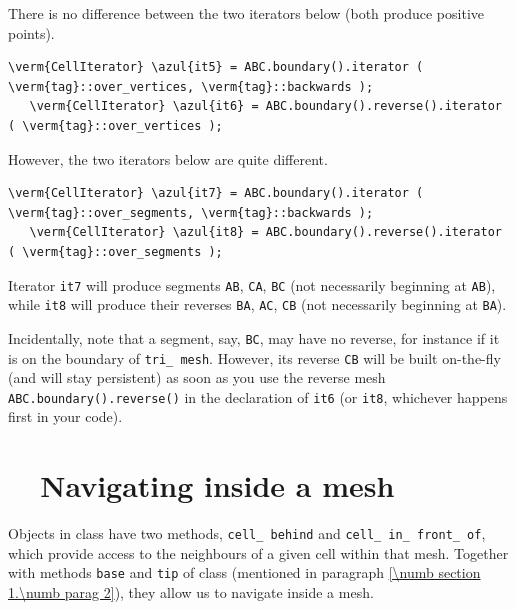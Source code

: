 There is no difference between the two iterators below (both produce positive
points).

\begin{Verbatim}[commandchars=\\\{\},formatcom=\small\tt,
   baselinestretch=0.94,framesep=2mm                      ]
   \verm{CellIterator} \azul{it5} = ABC.boundary().iterator ( \verm{tag}::over_vertices, \verm{tag}::backwards );
   \verm{CellIterator} \azul{it6} = ABC.boundary().reverse().iterator ( \verm{tag}::over_vertices );
\end{Verbatim}

However, the two iterators below are quite different.

\begin{Verbatim}[commandchars=\\\{\},formatcom=\small\tt,
   baselinestretch=0.94,framesep=2mm                      ]
   \verm{CellIterator} \azul{it7} = ABC.boundary().iterator ( \verm{tag}::over_segments, \verm{tag}::backwards );
   \verm{CellIterator} \azul{it8} = ABC.boundary().reverse().iterator ( \verm{tag}::over_segments );
\end{Verbatim}

Iterator {\small\tt it7} will produce segments {\small\tt AB}, {\small\tt CA}, {\small\tt BC}
(not necessarily beginning at {\small\tt AB}), while {\small\tt it8} will produce their reverses
{\small\tt BA}, {\small\tt AC}, {\small\tt CB} (not necessarily beginning at {\small\tt BA}).

Incidentally, note that a segment, say, {\small\tt BC}, may have no reverse,
for instance if it is on the boundary of {\small\tt tri\_\,mesh}.
However, its reverse {\small\tt CB} will be built on-the-fly (and will stay persistent)
as soon as you use the reverse mesh {\small\tt ABC.boundary().reverse()} in the declaration of
{\small\tt it6} (or {\small\tt it8}, whichever happens first in your code).


\section{~~Navigating inside a mesh}\label{\numb section 9.\numb parag 8}

Objects in class {\small\tt {}} have two methods, {\small\tt cell\_\,behind} and
{\small\tt cell\_\,in\_\,front\_\,of},
which provide access to the neighbours of a given cell within that mesh.
Together with methods {\small\tt base} and {\small\tt tip} of class {\small\tt {}}
(mentioned in paragraph \ref{\numb section 1.\numb parag 2}), they allow us to navigate inside
a mesh.


